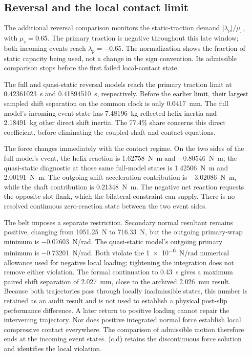 \documentclass[11pt]{report}
\numberwithin{equation}{section}
\begin{document}
\subsection{Reversal and the local contact limit}
\label{app:secondary_contact_limit}

The additional reversal comparison monitors the static-traction demand
\(\lvert\lambda_p\rvert/\mu_s\), with \(\mu_s=0.65\).
The primary traction is negative throughout this late window; both incoming
events reach \(\lambda_p=-0.65\). The normalization shows the fraction of static capacity being used, not a change in the sign convention. Its admissible comparison
stops before the first failed local-contact state.

The full and quasi-static reversal models reach the primary traction limit
at \SI{0.42361023}{s} and \SI{0.41894510}{s}, respectively. Before the
earlier limit, their largest sampled shift separation on the common clock
is only \SI{0.0417}{mm}. The full model's incoming event state has
\SI{7.48196}{kg} reflected helix inertia and \SI{2.18491}{kg} other direct
shift inertia. The 77.4\% share concerns this direct coefficient, before
eliminating the coupled shaft and contact equations.

The force changes immediately with the contact regime. On the two sides of
the full model's event, the helix reaction is
\SI{1.62758}{N.m} and \SI{-0.80546}{N.m}; the quasi-static diagnostic
at those same full-model states is \SI{1.42506}{N.m} and
\SI{2.00191}{N.m}. The outgoing shift-acceleration contribution is
\SI{-3.02086}{N.m}, while the shaft contribution is
\SI{0.21348}{N.m}. The negative net reaction requests the opposite slot
flank, which the bilateral constraint can supply. There is no resolved
continuous zero-reaction state between the two event sides.

The belt imposes a separate restriction. Secondary normal resultant remains
positive, changing from \SI{1051.25}{N} to \SI{716.33}{N}, but the outgoing
primary-wrap minimum is \SI{-0.07603}{N/rad}. The quasi-static model's
outgoing primary minimum is \SI{-0.73201}{N/rad}. Both violate the
\SI{1e-6}{N/rad} numerical allowance used for negative local loading;
tightening the integration does not remove either violation.
The formal continuation to \SI{0.43}{s} gives a maximum paired shift
separation of \SI{2.027}{mm}, close to the archived \SI{2.026}{mm} result.
Because both trajectories pass through locally inadmissible states, this
number is retained as an audit result and is not used to establish a
physical post-slip performance difference. A later return to positive
loading cannot repair the intervening trajectory. Nor does positive
integrated normal force establish local compressive contact everywhere.
The comparison of admissible motion therefore ends at the incoming event states.
(c,d) retains the discontinuous force solution
and identifies the local violation.
\end{document}
